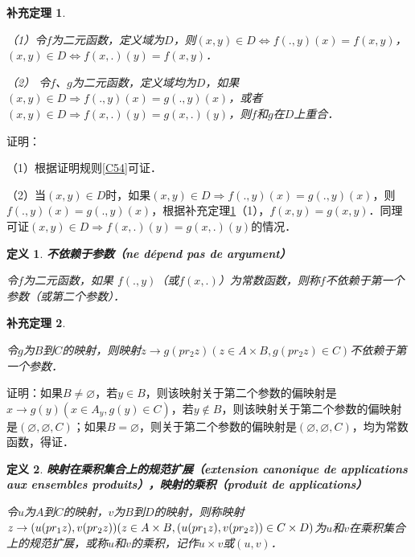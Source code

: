 \documentclass[12pt, a4paper, oneside]{book}
\newtheorem{cor}{补充定理}
\newtheorem{de}{定义}
\begin{document}
			\begin{cor}\label{cor82}
				\hfill\par
				（1）令$f$为二元函数，定义域为$D$，则$(x, y)\in D\Leftrightarrow f(., y)(x)=f(x, y)$，$(x, y)\in D\Leftrightarrow f(x, .)(y)=f(x, y)$．
				\par
				（2）	令$f$、$g$为二元函数，定义域均为$D$，如果$(x, y)\in D\Rightarrow f(., y)(x)=g(., y)(x)$，或者$(x, y)\in D\Rightarrow f(x, .)(y)=g(x, .)(y)$，则$f$和$g$在$D$上重合．
			\end{cor}
			证明：
			\par
			（1）根据证明规则\ref{C54}可证．
			\par
			（2）当$(x, y)\in D$时，如果$(x, y)\in D\Rightarrow f(., y)(x)=g(., y)(x)$，则$f(., y)(x)=g(., y)(x)$，根据补充定理\ref{cor82}（1），$f(x, y)=g(x, y)$．同理可证$(x, y)\in D\Rightarrow f(x, .)(y)=g(x, .)(y)$的情况．			

			\begin{de}
				\textbf{不依赖于参数（ne dépend pas de argument）}
				\par
				令$f$为二元函数，如果 $f(., y)$（或$f(x, .)$）为常数函数，则称$f$不依赖于第一个参数（或第二个参数）．
			\end{de}
			
			\begin{cor}\label{cor83}
				\hfill\par
				令$g$为$B$到$C$的映射，则映射$z\to g(pr_2z)(z\in A\times B, g(pr_2z)\in C)$不依赖于第一个参数．
			\end{cor}
			证明：如果$B\neq \varnothing$，若$y\in B$，则该映射关于第二个参数的偏映射是$x\to g(y)(x\in A_y, g(y)\in C)$，若$y\notin B$，则该映射关于第二个参数的偏映射是$(\varnothing, \varnothing, C)$；如果$B=\varnothing$，则关于第二个参数的偏映射是$(\varnothing, \varnothing, C)$，均为常数函数，得证．

			\begin{de}
				\textbf{映射在乘积集合上的规范扩展（extension canonique de applications aux ensembles produits），映射的乘积（produit de applications）}
				\par
				令$u$为$A$到$C$的映射，$v$为$B$到$D$的映射，则称映射$z\to (u(pr_1z), v(pr_2z))(z\in A\times B, \\(u(pr_1z), v(pr_2z))\in C\times D)$为$u$和$v$在乘积集合上的规范扩展，或称$u$和$v$的乘积，记作$u\times v$或$(u, v)$．
			\end{de}
\end{document}
